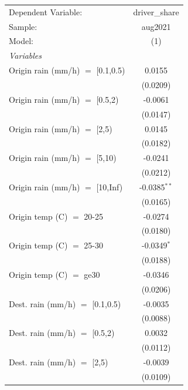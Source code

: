 \ifdefined\ifclassloaded
{}
\fi

\begingroup
\centering
\begin{tabular}{lc}
   \tabularnewline \midrule \midrule
   Dependent Variable:              & driver\_share\\   
   Sample:                          & aug2021 \\   
   Model:                           & (1)\\  
   \midrule
   \emph{Variables}\\
   Origin rain (mm/h) $=$ [0.1,0.5) & 0.0155\\   
                                    & (0.0209)\\   
   Origin rain (mm/h) $=$ [0.5,2)   & -0.0061\\   
                                    & (0.0147)\\   
   Origin rain (mm/h) $=$ [2,5)     & 0.0145\\   
                                    & (0.0182)\\   
   Origin rain (mm/h) $=$ [5,10)    & -0.0241\\   
                                    & (0.0212)\\   
   Origin rain (mm/h) $=$ [10,Inf)  & -0.0385$^{**}$\\   
                                    & (0.0165)\\   
   Origin temp (C) $=$ 20-25        & -0.0274\\   
                                    & (0.0180)\\   
   Origin temp (C) $=$ 25-30        & -0.0349$^{*}$\\   
                                    & (0.0188)\\   
   Origin temp (C) $=$ ge30         & -0.0346\\   
                                    & (0.0206)\\   
   Dest. rain (mm/h) $=$ [0.1,0.5)  & -0.0035\\   
                                    & (0.0088)\\   
   Dest. rain (mm/h) $=$ [0.5,2)    & 0.0032\\   
                                    & (0.0112)\\   
   Dest. rain (mm/h) $=$ [2,5)      & -0.0039\\   
                                    & (0.0109)\\   

\end{tabular}
